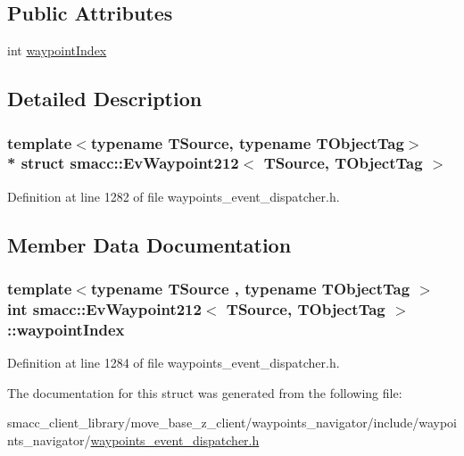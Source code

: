 \subsection*{Public Attributes}
\begin{DoxyCompactItemize}
\item 
int \hyperlink{structsmacc_1_1EvWaypoint212_aaec383f54c92574e0270ab25adf29d7c}{waypoint\+Index}
\end{DoxyCompactItemize}


\subsection{Detailed Description}
\subsubsection*{template$<$typename T\+Source, typename T\+Object\+Tag$>$\\*
struct smacc\+::\+Ev\+Waypoint212$<$ T\+Source, T\+Object\+Tag $>$}



Definition at line 1282 of file waypoints\+\_\+event\+\_\+dispatcher.\+h.



\subsection{Member Data Documentation}
\subsubsection[{\texorpdfstring{waypoint\+Index}{waypointIndex}}]{\setlength{\rightskip}{0pt plus 5cm}template$<$typename T\+Source , typename T\+Object\+Tag $>$ int {\bf smacc\+::\+Ev\+Waypoint212}$<$ T\+Source, T\+Object\+Tag $>$\+::waypoint\+Index}\hypertarget{structsmacc_1_1EvWaypoint212_aaec383f54c92574e0270ab25adf29d7c}{}\label{structsmacc_1_1EvWaypoint212_aaec383f54c92574e0270ab25adf29d7c}


Definition at line 1284 of file waypoints\+\_\+event\+\_\+dispatcher.\+h.



The documentation for this struct was generated from the following file\+:\begin{DoxyCompactItemize}
\item 
smacc\+\_\+client\+\_\+library/move\+\_\+base\+\_\+z\+\_\+client/waypoints\+\_\+navigator/include/waypoints\+\_\+navigator/\hyperlink{waypoints__event__dispatcher_8h}{waypoints\+\_\+event\+\_\+dispatcher.\+h}\end{DoxyCompactItemize}
